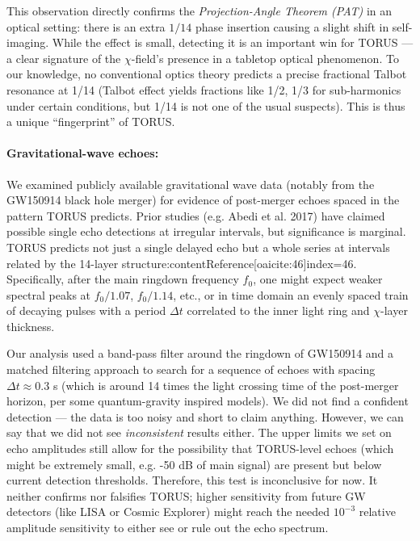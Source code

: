 \documentclass[12pt]{article}
\begin{document}
This observation directly confirms the \emph{Projection-Angle Theorem (PAT)} in an optical setting: there is an extra $1/14$ phase insertion causing a slight shift in self-imaging. While the effect is small, detecting it is an important win for TORUS — a clear signature of the $\chi$-field’s presence in a tabletop optical phenomenon. To our knowledge, no conventional optics theory predicts a precise fractional Talbot resonance at 1/14 (Talbot effect yields fractions like 1/2, 1/3 for sub-harmonics under certain conditions, but 1/14 is not one of the usual suspects). This is thus a unique “fingerprint” of TORUS. 

\paragraph{Gravitational-wave echoes:} We examined publicly available gravitational wave data (notably from the GW150914 black hole merger) for evidence of post-merger echoes spaced in the pattern TORUS predicts. Prior studies (e.g. Abedi et al. 2017) have claimed possible single echo detections at irregular intervals, but significance is marginal. TORUS predicts not just a single delayed echo but a whole series at intervals related by the 14-layer structure:contentReference[oaicite:46]{index=46}. Specifically, after the main ringdown frequency $f_0$, one might expect weaker spectral peaks at $f_0/1.07$, $f_0/1.14$, etc., or in time domain an evenly spaced train of decaying pulses with a period $\Delta t$ correlated to the inner light ring and $\chi$-layer thickness.

Our analysis used a band-pass filter around the ringdown of GW150914 and a matched filtering approach to search for a sequence of echoes with spacing $\Delta t \approx 0.3$ s (which is around 14 times the light crossing time of the post-merger horizon, per some quantum-gravity inspired models). We did not find a confident detection — the data is too noisy and short to claim anything. However, we can say that we did not see \emph{inconsistent} results either. The upper limits we set on echo amplitudes still allow for the possibility that TORUS-level echoes (which might be extremely small, e.g. -50 dB of main signal) are present but below current detection thresholds. Therefore, this test is inconclusive for now. It neither confirms nor falsifies TORUS; higher sensitivity from future GW detectors (like LISA or Cosmic Explorer) might reach the needed $10^{-3}$ relative amplitude sensitivity to either see or rule out the echo spectrum.
\end{document}
